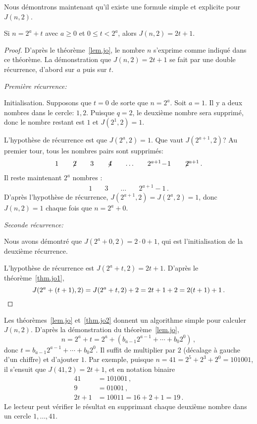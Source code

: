Nous démontrons maintenant qu'il existe une formule simple  et explicite pour $J(n,2)$. 
\begin{theorem}\label{thm.jo2}
Si $n=2^a+t$ avec $a\geq 0$ et $0\leq t < 2^a$, alors $J(n,2)=2t+1$.
\end{theorem}

\begin{proof}
D'après le théorème~\ref{lem.jo}, 
 le nombre $n$ s'exprime comme indiqué dans ce théorème. La démonstration que $J(n,2)=2t+1$ se fait par une double récurrence, d'abord sur $a$ puis sur $t$.

\textit{Première récurrence:}

Initialisation. Supposons que $t=0$ de sorte que $n=2^a$. Soit $a=1$.  Il y a deux nombres dans le cercle: $1,2$. Puisque $q=2$, le deuxième nombre sera supprimé, donc le nombre restant est $1$ et $J(2^1,2)=1$.

L'hypothèse de récurrence est que $J(2^a,2)=1$. Que vaut $J(2^{a+1},2)$? Au premier tour, tous les nombres pairs sont supprimés:
\[
\begin{array}{rrrrrrrrrrrrrrrrrrrrrrrrrrrr}
1&\quad\not\! 2&\quad3&\quad\not\! 4& \quad\ldots&\quad 2^{a+1}\!-\!1&\quad \not\! 2^{a+1}\,.
\end{array}
\]
Il reste maintenant $2^a$ nombres :
\[
\begin{array}{rrrrrrrrrrrrrrrrrrrrrrrrrrrr}
1&\quad3&\quad\ldots&\quad 2^{a+1}\!-\!1\,.
\end{array}
\]
D'après l'hypothèse de récurrence, $J(2^{a+1},2)=J(2^a,2)=1$, donc  $J(n,2)=1$ chaque fois que $n=2^a+0$.

\textit{Seconde récurrence:}

Nous avons démontré que $J(2^a+0,2)=2\cdot 0 +1$, qui est l'initialisation de la deuxième récurrence.

L'hypothèse de récurrence est $J(2^a+t,2)=2t+1$. D'après le théorème~\ref{thm.jo1},
\[
J(2^a+(t+1),2)=J(2^a+t,2)+2=2t+1+2=2(t+1)+1\,.
\qedhere\]
\end{proof}


Les théorèmes~\ref{lem.jo} et~\ref{thm.jo2} donnent un algorithme simple pour calculer $J(n,2)$. D'après la démonstration du théorème~\ref{lem.jo},
\[
n=2^a+t=2^a+(b_{a-1}2^{a-1}+\cdots+b_{0}2^{0})\,,
\]
donc $t=b_{a-1}2^{a-1}+\cdots+b_{0}2^{0}$. Il suffit de multiplier par $2$ (décalage à gauche d'un chiffre) et d'ajouter $1$. Par exemple, puisque $n=41=2^5+2^3+2^0=101001$, il s'ensuit que $J(41,2)=2t+1$, et en notation binaire 
\begin{align*}
41&=101001\,,\\
9&=01001\,,\\
2t+1&=10011=16+2+1=19\,.
\end{align*}
Le lecteur peut vérifier le résultat en supprimant chaque deuxième nombre dans un cercle $1,\ldots,41$.

